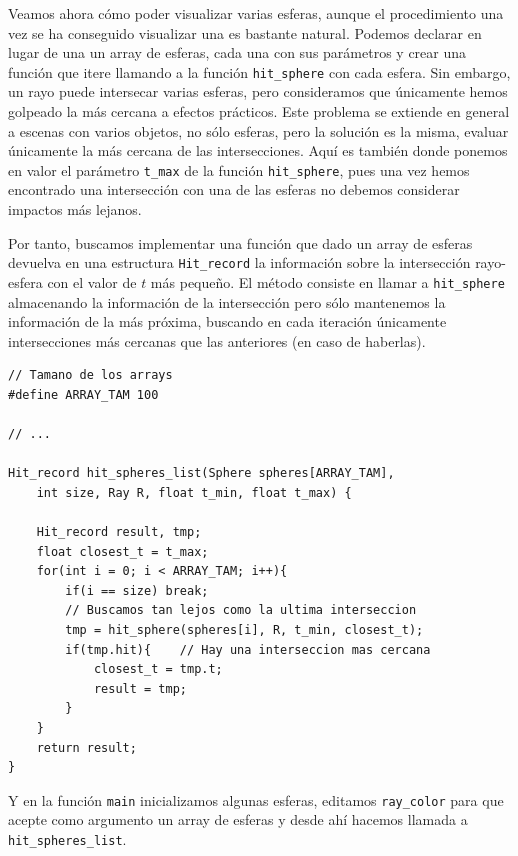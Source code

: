 Veamos ahora cómo poder visualizar varias esferas, aunque el procedimiento una vez se ha conseguido visualizar una es bastante natural. Podemos declarar en lugar de una un array de esferas, cada una con sus parámetros y crear una función que itere llamando a la función \verb|hit_sphere| con cada esfera. Sin embargo, un rayo puede intersecar varias esferas, pero consideramos que únicamente hemos golpeado la más cercana a efectos prácticos. Este problema se extiende en general a escenas con varios objetos, no sólo esferas, pero la solución es la misma, evaluar únicamente la más cercana de las intersecciones. Aquí es también donde ponemos en valor el parámetro \verb|t_max| de la función \verb|hit_sphere|, pues una vez hemos encontrado una intersección con una de las esferas no debemos considerar impactos más lejanos.

Por tanto, buscamos implementar una función que dado un array de esferas devuelva en una estructura \verb|Hit_record| la información sobre la intersección rayo-esfera con el valor de $t$ más pequeño. El método consiste en llamar a \verb|hit_sphere| almacenando la información de la intersección pero sólo mantenemos la información de la más próxima, buscando en cada iteración únicamente intersecciones más cercanas que las anteriores (en caso de haberlas).
\begin{lstlisting}
// Tamano de los arrays
#define ARRAY_TAM 100

// ... 

Hit_record hit_spheres_list(Sphere spheres[ARRAY_TAM], 
    int size, Ray R, float t_min, float t_max) {

    Hit_record result, tmp;
    float closest_t = t_max;
    for(int i = 0; i < ARRAY_TAM; i++){
        if(i == size) break;
        // Buscamos tan lejos como la ultima interseccion
        tmp = hit_sphere(spheres[i], R, t_min, closest_t);
        if(tmp.hit){    // Hay una interseccion mas cercana
            closest_t = tmp.t;
            result = tmp;
        }
    }
    return result;
}
\end{lstlisting} 

Y en la función \verb|main| inicializamos algunas esferas, editamos \verb|ray_color| para que acepte como argumento un array de esferas y desde ahí hacemos llamada a \verb|hit_spheres_list|.

